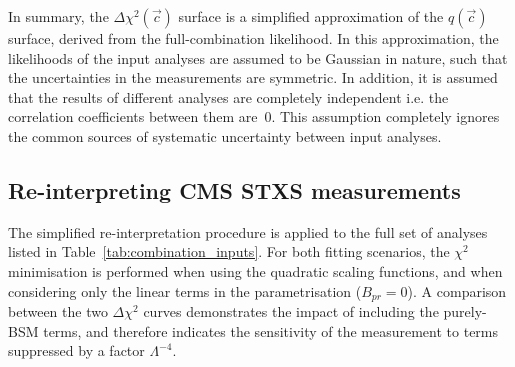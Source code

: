 In summary, the $\Delta\chi^2(\vec{c})$ surface is a simplified approximation of the $q(\vec{c})$ surface, derived from the full-combination likelihood. In this approximation, the likelihoods of the input analyses are assumed to be Gaussian in nature, such that the uncertainties in the measurements are symmetric. In addition, it is assumed that the results of different analyses are completely independent i.e. the correlation coefficients between them are~0. This assumption completely ignores the common sources of systematic uncertainty between input analyses.

\subsection{Re-interpreting CMS STXS measurements}\label{sec:hel_simplified_cms}
The simplified re-interpretation procedure is applied to the full set of analyses listed in Table~\ref{tab:combination_inputs}. For both fitting scenarios, the $\chi^2$ minimisation is performed when using the quadratic scaling functions, and when considering only the linear terms in the parametrisation ($B_{pr}=0$). A comparison between the two $\Delta\chi^2$ curves demonstrates the impact of including the purely-BSM terms, and therefore indicates the sensitivity of the measurement to terms suppressed by a factor $\Lambda^{-4}$. 

